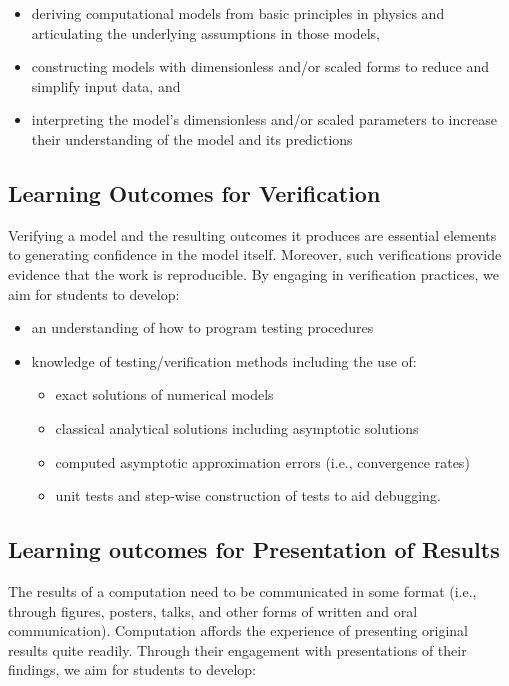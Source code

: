 \documentclass[graybox,envcountchap,sectrefs]{svmult}
\begin{document}
\begin{itemize}
\item deriving computational models from basic principles in physics and articulating the underlying assumptions in those models,

\item constructing models with dimensionless and/or scaled forms to reduce and simplify input data, and

\item interpreting the model's dimensionless and/or scaled parameters to increase their understanding of the model and its predictions
\end{itemize}


\subsection{Learning Outcomes for Verification}
Verifying a model and the resulting outcomes it produces are essential elements to generating confidence in the model itself. Moreover, such verifications provide evidence that the work is reproducible. By engaging in verification practices, we aim for students to develop:

\begin{itemize}
\item an understanding of how to program testing procedures

\item knowledge of testing/verification methods including the use of:
\begin{itemize}

  \item exact solutions of numerical models

  \item classical analytical solutions including asymptotic solutions

  \item computed asymptotic approximation errors (i.e., convergence rates)

  \item unit tests and step-wise construction of tests to aid debugging.
\end{itemize}


\end{itemize}


\subsection{Learning outcomes for Presentation of Results}
The results of a computation need to be communicated in some format (i.e., through figures, posters, talks, and other forms of written and oral communication). Computation affords the experience of presenting original results quite readily. Through their engagement with presentations of their findings, we aim for students to develop:
\end{document}
